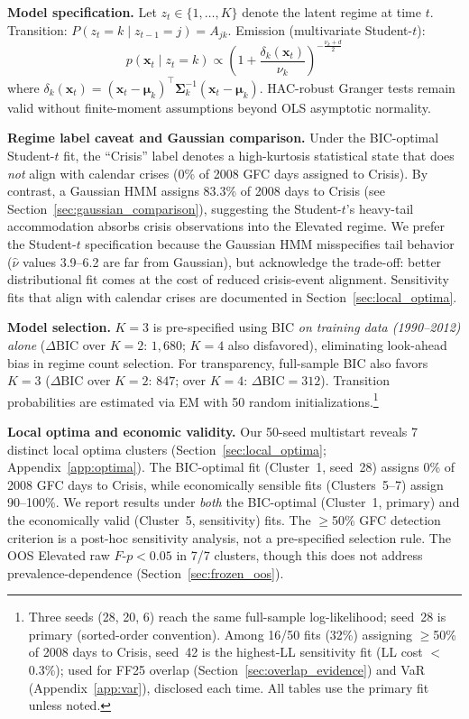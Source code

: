 \documentclass[sigconf,anonymous]{acmart}
\begin{document}
\textbf{Model specification.}
Let $z_t \in \{1, \ldots, K\}$ denote the latent regime at time $t$.
Transition: $P(z_t = k \mid z_{t-1} = j) = A_{jk}$.
Emission (multivariate Student-$t$):
\begin{equation}
p(\mathbf{x}_t \mid z_t = k) \propto \left(1 + \frac{\delta_k(\mathbf{x}_t)}{\nu_k}\right)^{-\frac{\nu_k+d}{2}}
\end{equation}
where $\delta_k(\mathbf{x}_t) = (\mathbf{x}_t - \boldsymbol{\mu}_k)^\top\boldsymbol{\Sigma}_k^{-1}(\mathbf{x}_t - \boldsymbol{\mu}_k)$.
HAC-robust Granger tests remain valid without finite-moment assumptions
beyond OLS asymptotic normality.

\textbf{Regime label caveat and Gaussian comparison.}
Under the BIC-optimal Student-$t$ fit, the ``Crisis'' label
denotes a high-kurtosis statistical state that does \emph{not} align with
calendar crises (0\% of 2008 GFC days assigned to Crisis).
By contrast, a Gaussian HMM assigns 83.3\% of 2008 days to Crisis
(see Section~\ref{sec:gaussian_comparison}), suggesting the
Student-$t$'s heavy-tail accommodation absorbs crisis observations
into the Elevated regime. We prefer the Student-$t$ specification
because the Gaussian HMM misspecifies tail behavior ($\hat{\nu}$ values
3.9--6.2 are far from Gaussian), but acknowledge the trade-off:
better distributional fit comes at the cost of reduced crisis-event
alignment. Sensitivity fits that align with calendar crises are
documented in Section~\ref{sec:local_optima}.

\textbf{Model selection.} $K = 3$ is pre-specified using BIC
\emph{on training data (1990--2012) alone}
($\Delta\text{BIC}$ over $K = 2$: $1{,}680$; $K = 4$ also disfavored),
eliminating look-ahead bias in regime count selection.
For transparency, full-sample BIC also favors $K = 3$ ($\Delta\text{BIC}$
over $K = 2$: $847$; over $K = 4$: $\Delta\text{BIC} = 312$). Transition
probabilities are estimated via EM with 50 random
initializations.\footnote{Three seeds (28, 20, 6) reach the same full-sample
log-likelihood; seed~28 is primary (sorted-order convention).
Among 16/50 fits (32\%) assigning $\geq$50\% of 2008 days to Crisis,
seed~42 is the highest-LL sensitivity fit (LL cost $<$0.3\%); used for
FF25 overlap (Section~\ref{sec:overlap_evidence}) and VaR
(Appendix~\ref{app:var}), disclosed each time. All tables use the primary
fit unless noted.}

\textbf{Local optima and economic validity.}
Our 50-seed multistart reveals 7 distinct local optima clusters (Section~\ref{sec:local_optima};
Appendix~\ref{app:optima}). The BIC-optimal fit (Cluster~1, seed~28) assigns 0\% of 2008
GFC days to Crisis, while economically sensible fits (Clusters~5--7) assign
90--100\%. We report results under \emph{both} the BIC-optimal (Cluster~1, primary)
and the economically valid (Cluster~5, sensitivity) fits. The $\geq$50\% GFC detection
criterion is a post-hoc sensitivity analysis, not a pre-specified selection rule.
The OOS Elevated raw $F$-$p < 0.05$ in 7/7 clusters, though this
does not address prevalence-dependence (Section~\ref{sec:frozen_oos}).
\end{document}
